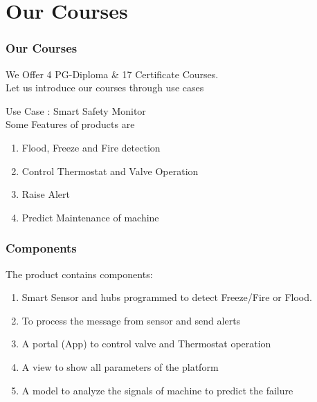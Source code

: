 \section{Our Courses}


\begin{frame}
\frametitle{Our Courses}

We Offer 4 PG-Diploma \&
17 Certificate Courses.  \\ \vspace{1cm}
Let us introduce our courses through use cases

{\centering Use Case :  {\Large  Smart Safety Monitor \\ }}
\vspace{1cm}
Some Features of products are
\begin{enumerate}
\item Flood, Freeze and Fire detection
\item Control Thermostat and Valve Operation
\item Raise Alert
\item Predict Maintenance of machine 
\end{enumerate}
\end{frame}

\begin{frame}
	\frametitle{Components}
	The product contains components:
	\begin{enumerate}
		\item Smart Sensor and hubs programmed to detect Freeze/Fire or Flood.
		\item To process the message from sensor and send alerts
		\item A portal (App) to control valve and Thermostat operation
		\item A view to show all parameters of the platform
		\item A model to analyze the signals of machine to predict the failure
	\end{enumerate}
\end{frame}
